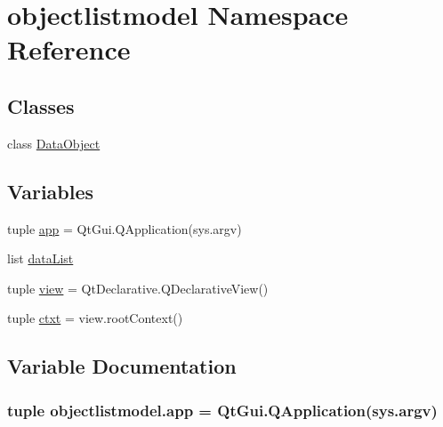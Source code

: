 \hypertarget{namespaceobjectlistmodel}{}\section{objectlistmodel Namespace Reference}
\label{namespaceobjectlistmodel}
\subsection*{Classes}
\begin{DoxyCompactItemize}
\item 
class \hyperlink{classobjectlistmodel_1_1DataObject}{Data\+Object}
\end{DoxyCompactItemize}
\subsection*{Variables}
\begin{DoxyCompactItemize}
\item 
tuple \hyperlink{namespaceobjectlistmodel_ac4345e286ac69bd6a1482b6a3e75b15c}{app} = Qt\+Gui.\+Q\+Application(sys.\+argv)
\item 
list \hyperlink{namespaceobjectlistmodel_aa46cee25e481d86da7227932f94c48c2}{data\+List}
\item 
tuple \hyperlink{namespaceobjectlistmodel_aec05dc7eb9ce37f90feaed5c139ebb3a}{view} = Qt\+Declarative.\+Q\+Declarative\+View()
\item 
tuple \hyperlink{namespaceobjectlistmodel_af873ed3af799c30194de5e894ea7d706}{ctxt} = view.\+root\+Context()
\end{DoxyCompactItemize}


\subsection{Variable Documentation}
\hypertarget{namespaceobjectlistmodel_ac4345e286ac69bd6a1482b6a3e75b15c}{}
\subsubsection[{app}]{\setlength{\rightskip}{0pt plus 5cm}tuple objectlistmodel.\+app = Qt\+Gui.\+Q\+Application(sys.\+argv)}\label{namespaceobjectlistmodel_ac4345e286ac69bd6a1482b6a3e75b15c}
\hypertarget{namespaceobjectlistmodel_af873ed3af799c30194de5e894ea7d706}{}
